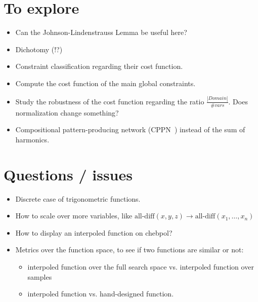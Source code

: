 \documentclass[a4paper, 12pt]{article}
\begin{document}
\section{To explore}
\begin{itemize}
\item Can the Johnson-Lindenstrauss Lemma be useful here?
\item Dichotomy (!?)
\item Constraint classification regarding their cost function.
\item Compute the cost function of the main global constraints.
\item Study the robustness of the cost function regarding the ratio $\frac{|Domain|}{\# vars}$. Does normalization change something?
\item Compositional pattern-producing network (CPPN~\cite{CPPN}) instead of the sum of harmonics.
\end{itemize}

\section{Questions / issues}
\begin{itemize}
\item Discrete case of trigonometric functions.
\item How to scale over more variables, like $\text{all-diff}(x, y, z)
  \rightarrow \text{all-diff}(x_1, \ldots, x_n)$
\item How to display an interpoled function on chebpol?
\item Metrics  over the function  space, to  see if two  functions are
  similar or not:
  \begin{itemize}
  \item interpoled function over the  full search space vs. interpoled
    function over samples
  \item interpoled function vs. hand-designed function.
  \end{itemize}
\end{itemize}




\end{document}
